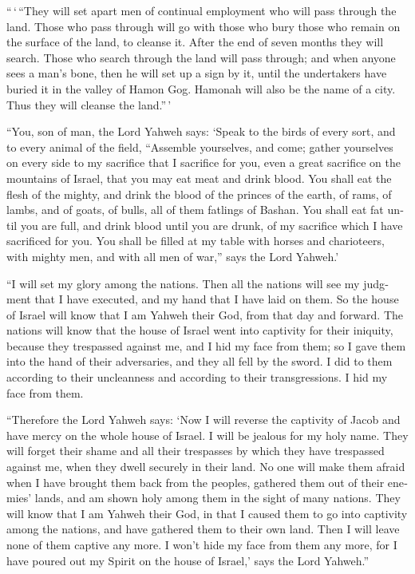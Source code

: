 \begin{paracol}{2}
\begin{otherlanguage}{english}
 ``\,`\,``They will set apart men of continual employment
who will pass through the land. Those who pass through will go with
those who bury those who remain on the surface of the land, to cleanse
it. After the end of seven months they will search. 
Those who search through the land will pass through; and when anyone
sees a man's bone, then he will set up a sign by it, until the
undertakers have buried it in the valley of Hamon Gog. 
Hamonah will also be the name of a city. Thus they will cleanse the
land.''\,'

 ``You, son of man, the Lord Yahweh says: `Speak to the
birds of every sort, and to every animal of the field, ``Assemble
yourselves, and come; gather yourselves on every side to my sacrifice
that I sacrifice for you, even a great sacrifice on the mountains of
Israel, that you may eat meat and drink blood.  You shall
eat the flesh of the mighty, and drink the blood of the princes of the
earth, of rams, of lambs, and of goats, of bulls, all of them fatlings
of Bashan.  You shall eat fat until you are full, and
drink blood until you are drunk, of my sacrifice which I have sacrificed
for you.  You shall be filled at my table with horses and
charioteers, with mighty men, and with all men of war,'' says the Lord
Yahweh.'

 ``I will set my glory among the nations. Then all the
nations will see my judgment that I have executed, and my hand that I
have laid on them.  So the house of Israel will know that
I am Yahweh their God, from that day and forward.  The
nations will know that the house of Israel went into captivity for their
iniquity, because they trespassed against me, and I hid my face from
them; so I gave them into the hand of their adversaries, and they all
fell by the sword.  I did to them according to their
uncleanness and according to their transgressions. I hid my face from
them.

 ``Therefore the Lord Yahweh says: `Now I will reverse
the captivity of Jacob and have mercy on the whole house of Israel. I
will be jealous for my holy name.  They will forget their
shame and all their trespasses by which they have trespassed against me,
when they dwell securely in their land. No one will make them afraid
 when I have brought them back from the peoples, gathered
them out of their enemies' lands, and am shown holy among them in the
sight of many nations.  They will know that I am Yahweh
their God, in that I caused them to go into captivity among the nations,
and have gathered them to their own land. Then I will leave none of them
captive any more.  I won't hide my face from them any
more, for I have poured out my Spirit on the house of Israel,' says the
Lord Yahweh.''


\end{otherlanguage}
\end{paracol}

